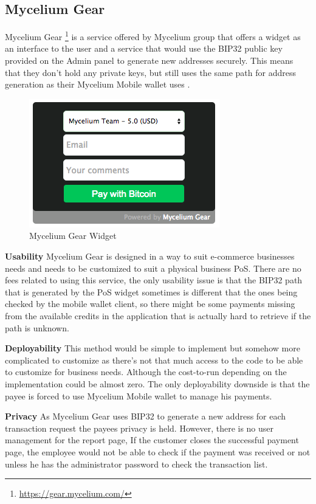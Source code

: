 \subsection{Mycelium Gear}
Mycelium Gear \footnote{\url{https://gear.mycelium.com/}} is a service offered by Mycelium group that offers a widget as an interface to the user and a service that would use the BIP32 public key provided on the Admin panel to generate new addresses securely. This means that they don't hold any private keys, but still uses the same path for address generation as their Mycelium Mobile wallet uses .

\begin{figure}[htb]
\centering
\includegraphics[scale=0.5]{fig/Mycelium_gear.png}
  \caption{Mycelium Gear Widget}
\label{fig:mycelium-widget}
\end{figure}


\textbf{Usability}
Mycelium Gear is designed in a way to suit e-commerce businesses needs and needs to be customized to suit a physical business PoS. There are no fees related to using this service, the only usability issue is that the BIP32 path that is generated by the PoS widget sometimes is different that the ones being checked by the mobile wallet client, so there might be some payments missing from the available credits in the application that is actually hard to retrieve if the path is unknown.

\textbf{Deployability}
This method would be simple to implement but somehow more complicated to customize as there's not that much access to the code to be able to customize for business needs. Although the cost-to-run depending on the implementation could be almost zero. The only deployability downside is that the payee is forced to use Mycelium Mobile wallet to manage his payments.

 \textbf{Privacy}
As Mycelium Gear uses BIP32 to generate a new address for each transaction request the payees privacy is held. However, there is no user management for the report page, If the customer closes the successful payment page, the employee would not be able to check if the payment was received or not unless he has the administrator password to check the transaction list.

